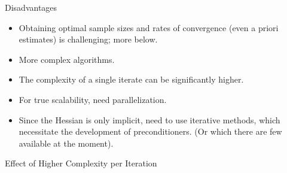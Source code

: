 \documentclass[aspectratio=169,xcolor=dvipsnames,10pt]{beamer}
\begin{document}
\begin{frame}{Disadvantages}
    \begin{itemize}
        \item Obtaining optimal sample sizes and rates of convergence (even a priori estimates) is challenging; more below.
        \item More complex algorithms.
        \item The complexity of a single iterate can be significantly higher.
        \item For true scalability, need parallelization.
        \item Since the Hessian is only implicit, need to use iterative methods, which necessitate the development of preconditioners. (Or which there are few available at the moment).
    \end{itemize}
\end{frame}

\begin{frame}{Effect of Higher Complexity per Iteration}
    
\end{frame}
\end{document}
